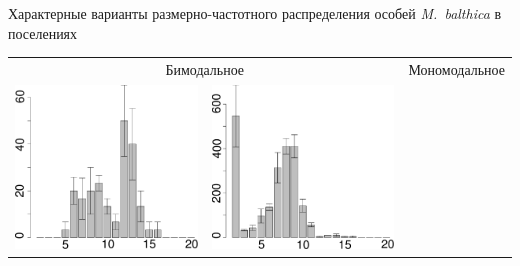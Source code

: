 \documentclass{beamer}
\begin{document}
\begin{frame}{Характерные варианты размерно-частотного распределения особей {\it M.~balthica} в поселениях}
	\begin{tabularx}{\linewidth}{XX|XX}
		\multicolumn{2}{c|}{\footnotesize Бимодальное} & \multicolumn{2}{c}{\footnotesize Мономодальное} \\
			\includegraphics[width=\linewidth]{sizestr2_1997_.pdf} & 
			\includegraphics[width=\linewidth]{sizestr2_2003_.pdf} & 

\end{tabularx}
\end{frame}
\end{document}
